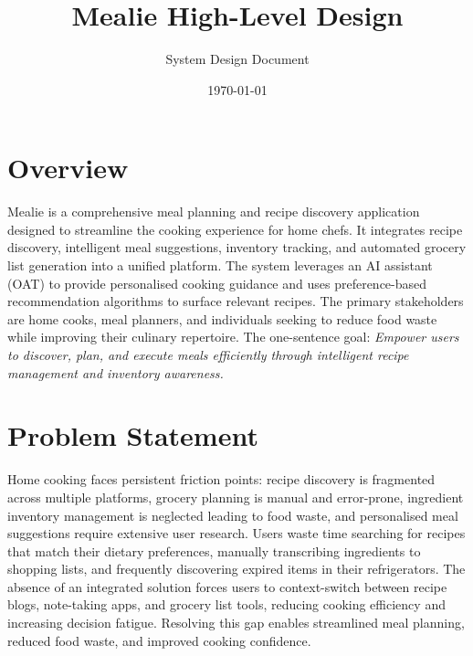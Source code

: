 \documentclass[12pt]{article}
\title{\textbf{Mealie High-Level Design}}
\author{System Design Document}
\date{\today}
\begin{document}
\maketitle

\section{Overview}
Mealie is a comprehensive meal planning and recipe discovery application designed to streamline the cooking experience for home chefs. It integrates recipe discovery, intelligent meal suggestions, inventory tracking, and automated grocery list generation into a unified platform. The system leverages an AI assistant (OAT) to provide personalised cooking guidance and uses preference-based recommendation algorithms to surface relevant recipes. The primary stakeholders are home cooks, meal planners, and individuals seeking to reduce food waste while improving their culinary repertoire. The one-sentence goal: \emph{Empower users to discover, plan, and execute meals efficiently through intelligent recipe management and inventory awareness.}

\section{Problem Statement}
Home cooking faces persistent friction points: recipe discovery is fragmented across multiple platforms, grocery planning is manual and error-prone, ingredient inventory management is neglected leading to food waste, and personalised meal suggestions require extensive user research. Users waste time searching for recipes that match their dietary preferences, manually transcribing ingredients to shopping lists, and frequently discovering expired items in their refrigerators. The absence of an integrated solution forces users to context-switch between recipe blogs, note-taking apps, and grocery list tools, reducing cooking efficiency and increasing decision fatigue. Resolving this gap enables streamlined meal planning, reduced food waste, and improved cooking confidence.
\end{document}
